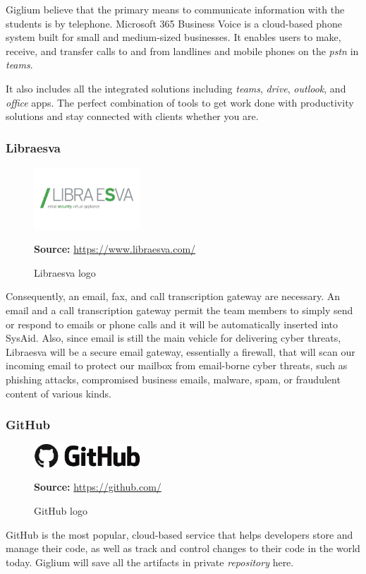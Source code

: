 Giglium believe that the primary means to communicate information with the students is by telephone. Microsoft 365 Business Voice\cite{teams-voice} is a cloud-based phone system built for small and medium-sized businesses. It enables users to make, receive, and transfer calls to and from landlines and mobile phones on the \textit{\gls{pstn}} in \textit{\gls{teams}}. 

It also includes all the integrated solutions including \textit{\gls{teams}}, \textit{\gls{drive}}, \textit{\gls{outlook}}, and \textit{\gls{office}} apps. The perfect combination of tools to get work done with productivity solutions and stay connected with clients whether you are. 

\subsubsection{Libraesva}

\begin{figure}[ht!]
	\centering
	\includegraphics[width=40mm]{./img/project/libraesva.png}
	\caption{Libraesva logo}\label{fig:libraesva}
	\textbf{Source:} \url{https://www.libraesva.com/}
\end{figure}

Consequently, an email, fax, and call transcription gateway are necessary. An email and a call transcription gateway permit the team members to simply send or respond to emails or phone calls and it will be automatically inserted into SysAid. Also, since email is still the main vehicle for delivering cyber threats, Libraesva\cite{libraesva} will be a secure email gateway, essentially a firewall, that will scan our incoming email to protect our mailbox from email-borne cyber threats, such as phishing attacks, compromised business emails, malware,  spam, or fraudulent content of various kinds.

\subsubsection{GitHub}

\begin{figure}[ht!]
	\centering
	\includegraphics[width=40mm]{./img/project/github.png}
	\caption{GitHub logo}\label{fig:github}
	\textbf{Source:} \url{https://github.com/}
\end{figure}

GitHub\cite{github} is the most popular, cloud-based service that helps developers store and manage their code, as well as track and control changes to their code in the world today. Giglium will save all the artifacts in private \textit{\gls{repository}} here.
